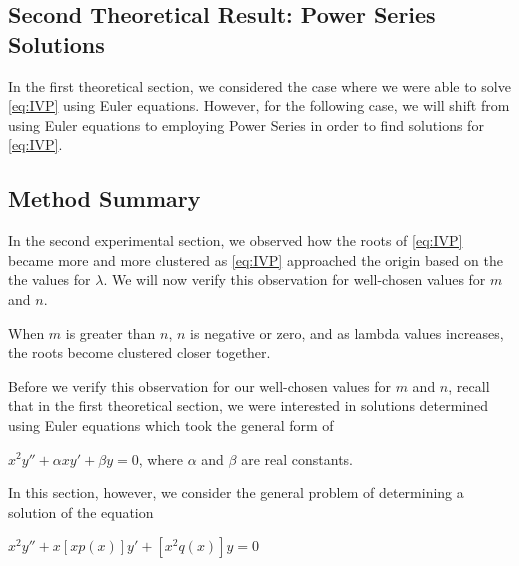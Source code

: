 \documentclass[executivepaper]{article}
\begin{document}
\pagebreak

\vspace*{-40mm}

\subsection*{Second Theoretical Result: Power Series Solutions}

In the first theoretical section, we considered the case where we were able to solve \eqref{eq:IVP} using Euler equations. However, for the following case, we will shift from using Euler equations to employing Power Series in order to find solutions for \eqref{eq:IVP}.

\subsection*{Method Summary}

In the second experimental section, we observed how the roots of \eqref{eq:IVP} became more and more clustered as \eqref{eq:IVP} approached the origin based on the the values for $\lambda$. We will now verify this observation for well-chosen values for $m$ and $n$.

\begin{observation}

When $m$ is greater than $n$, $n$ is negative or zero, and as lambda values increases, the roots become clustered closer together.
 
\end{observation}

\vspace{3mm}

Before we verify this observation for our well-chosen values for $m$ and $n$, recall that in the first theoretical section, we were interested in solutions determined using Euler equations which took the general form of

\begin{center}

$x^2y''+\alpha xy'+\beta y=0$, where $\alpha$ and $\beta$ are real constants.

\end{center}

In this section, however, we consider the general problem of determining a solution of the equation

\begin{center}

$x^2y'' + x[xp(x)]y' + [x^2q(x)]y=0$

\end{center}
\end{document}
